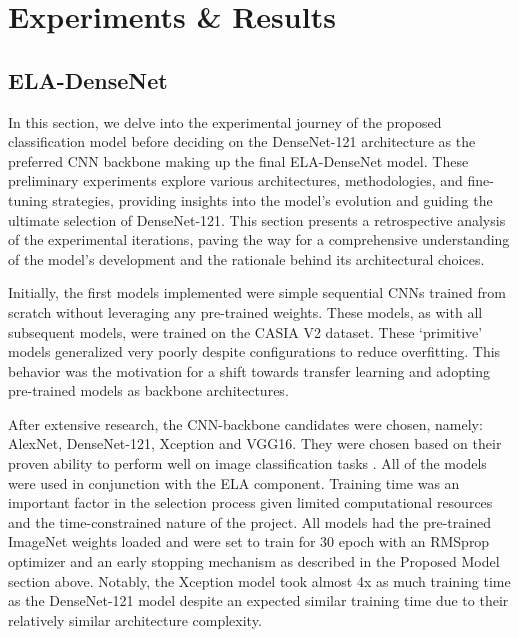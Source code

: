 \chapter{Experiments \& Results}\label{chap:results}

  \section{ELA-DenseNet} \label{sec:s1}

In this section, we delve into the experimental journey of the proposed classification model before deciding on the DenseNet-121 architecture as the preferred CNN backbone making up the final ELA-DenseNet model. These preliminary experiments explore various architectures, methodologies, and fine-tuning strategies, providing insights into the model's evolution and guiding the ultimate selection of DenseNet-121. This section presents a retrospective analysis of the experimental iterations, paving the way for a comprehensive understanding of the model's development and the rationale behind its architectural choices.

Initially, the first models implemented were simple sequential CNNs trained from scratch without leveraging any pre-trained weights. These models, as with all subsequent models, were trained on the CASIA V2 dataset. These `primitive' models generalized very poorly despite configurations to reduce overfitting. This behavior was the motivation for a shift towards transfer learning and adopting pre-trained models as backbone architectures. 

After extensive research, the CNN-backbone candidates were chosen, namely: AlexNet, DenseNet-121, Xception and VGG16. They were chosen based on their proven ability to perform well on image classification tasks \cite{MeenaTyagi2019}. All of the models were used in conjunction with the ELA component. Training time was an important factor in the selection process given limited computational resources and the time-constrained nature of the project. All models had the pre-trained ImageNet weights loaded and were set to train for 30 epoch with an RMSprop optimizer and an early stopping mechanism as described in the Proposed Model section above. Notably, the Xception model took almost 4x as much training time as the DenseNet-121 model despite an expected similar training time due to their relatively similar architecture complexity. 

